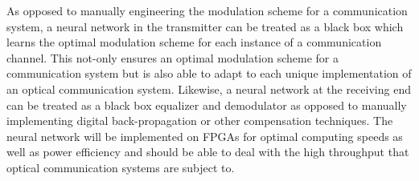 As opposed to manually engineering the modulation scheme for a communication system, a neural network in the transmitter can be treated as a black box which learns the optimal modulation scheme for each instance of a communication channel. This not-only ensures an optimal modulation scheme for a communication system but is also able to adapt to each unique implementation of an optical communication system. Likewise, a neural network at the receiving end can be treated as a black box equalizer and demodulator as opposed to manually implementing digital back-propagation or other compensation techniques. The neural network will be implemented on FPGAs for optimal computing speeds as well as power efficiency and should be able to deal with the high throughput that optical communication systems are subject to. 
